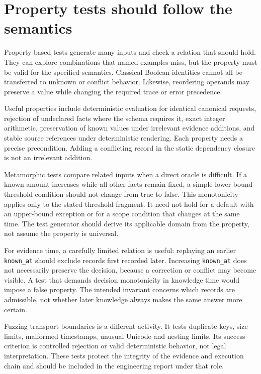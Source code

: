 \documentclass[12pt,a4paper,oneside,openany]{book}
\begin{document}
\section{Property tests should follow the semantics}

Property-based tests generate many inputs and check a relation that should hold.
They can explore combinations that named examples miss, but the property must
be valid for the specified semantics. Classical Boolean identities cannot all be
transferred to unknown or conflict behavior. Likewise, reordering operands may
preserve a value while changing the required trace or error precedence.

Useful properties include deterministic evaluation for identical canonical
requests, rejection of undeclared facts where the schema requires it, exact
integer arithmetic, preservation of known values under irrelevant evidence
additions, and stable source references under deterministic rendering. Each
property needs a precise precondition. Adding a conflicting record in the static
dependency closure is not an irrelevant addition.

Metamorphic tests compare related inputs when a direct oracle is difficult. If a
known amount increases while all other facts remain fixed, a simple lower-bound
threshold condition should not change from true to false. This monotonicity
applies only to the stated threshold fragment. It need not hold for a default
with an upper-bound exception or for a scope condition that changes at the same
time. The test generator should derive its applicable domain from the property,
not assume the property is universal.

For evidence time, a carefully limited relation is useful: replaying an earlier
\texttt{known\_at} should exclude records first recorded later. Increasing
\texttt{known\_at} does not necessarily preserve the decision, because a correction
or conflict may become visible. A test that demands decision monotonicity in
knowledge time would impose a false property. The intended invariant concerns
which records are admissible, not whether later knowledge always makes the same
answer more certain.

Fuzzing transport boundaries is a different activity. It tests duplicate keys,
size limits, malformed timestamps, unusual Unicode and nesting limits. Its
success criterion is controlled rejection or valid deterministic behavior, not
legal interpretation. These tests protect the integrity of the evidence and
execution chain and should be included in the engineering report under that role.
\end{document}
